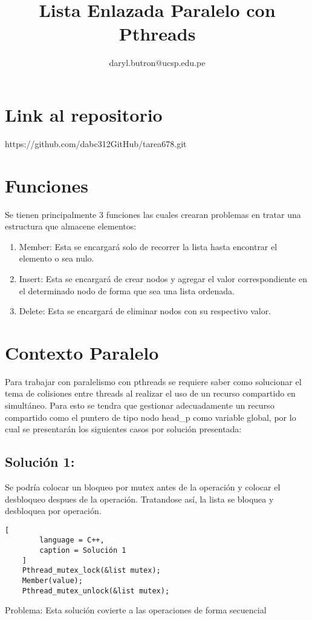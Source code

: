 \documentclass[11pt]{article}
\title{Lista Enlazada Paralelo con Pthreads}
\author{daryl.butron@ucsp.edu.pe}
\date{}
\begin{document}
    \maketitle

    \section{Link al repositorio}
    https://github.com/dabc312GitHub/tarea678.git

    \section{Funciones}
    Se tienen principalmente 3 funciones las cuales crearan problemas en
    tratar una estructura que almacene elementos:
    \begin{enumerate}
        \item Member: Esta se encargará solo de recorrer la lista hasta encontrar el
              elemento o sea nulo.
        \item Insert: Esta se encargará de crear nodos y agregar el valor correspondiente
              en el determinado nodo de forma que sea una lista ordenada.
        \item Delete: Esta se encargará de eliminar nodos con su respectivo valor.
    \end{enumerate}

    \section{Contexto Paralelo}
    Para trabajar con paralelismo con pthreads se requiere saber como solucionar el tema
    de colisiones entre threads al realizar el uso de un recurso compartido en simultáneo.
    Para esto se tendra que gestionar adecuadamente un recurso compartido como el puntero
    de tipo nodo head_p como variable global, por lo cual se presentarán los siguientes casos
    por solución presentada:

    \subsection[]{Solución 1: }
    Se podría colocar un bloqueo por mutex antes de la operación y colocar el desbloqueo
    despues de la operación. Tratandose así, la lista se bloquea y desbloquea por operación.
    \begin{lstlisting}[
        language = C++,
        caption = Solución 1
    ]
    Pthread_mutex_lock(&list mutex);
    Member(value);
    Pthread_mutex_unlock(&list mutex);
    \end{lstlisting}
    Problema: Esta solución covierte a las operaciones de forma secuencial
\end{document}
